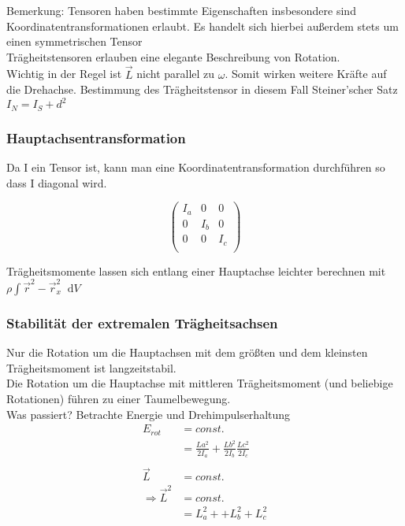 \documentclass[a4paper,12pt]{report}
\newcommand*\diff{\mathop{}\!\mathrm{d}}
\begin{document}
Bemerkung: Tensoren haben bestimmte Eigenschaften insbesondere sind Koordinatentransformationen erlaubt. Es handelt sich hierbei außerdem stets um einen symmetrischen Tensor\\


Trägheitstensoren erlauben eine elegante Beschreibung von Rotation. \\

Wichtig in der Regel ist $ \vec{L} $ nicht parallel zu $\omega$. Somit wirken weitere Kräfte auf die Drehachse. Bestimmung des Trägheitstensor in diesem Fall Steiner'scher Satz $ I_N = I_S + d^2 $ 


\subsubsection{Hauptachsentransformation}

Da I ein Tensor ist, kann man eine Koordinatentransformation durchführen so dass I diagonal wird.

\begin{equation}
\begin{pmatrix}
I_a & 0 & 0 \\
0 & I_b & 0 \\
0 & 0 & I_c \\
\end{pmatrix}
\end{equation}

Trägheitsmomente lassen sich entlang einer Hauptachse leichter berechnen mit $\rho \int \vec{r}^2 - \vec{r}_x ^2 \diff V $ \\

\subsubsection{Stabilität der extremalen Trägheitsachsen}

Nur die Rotation um die Hauptachsen mit dem größten und dem kleinsten Trägheitsmoment ist langzeitstabil.\\

Die Rotation um die Hauptachse mit mittleren Trägheitsmoment (und beliebige Rotationen)  führen zu einer Taumelbewegung. \\

Was passiert? Betrachte Energie und Drehimpulserhaltung\\

\begin{align*}
 E_{rot} &= const. \\
&= \frac{L a^2}{2 I_a} + \frac{L b^2}{2 I_b}  \frac{L c^2}{2 I_c} \\
\\
\vec{L} &= const. \\
\Rightarrow \vec{L}^2 &= const. \\
&= L_a^2 ++ L_b^2 + L_c^2 \\
\end{align*}
\end{document}
